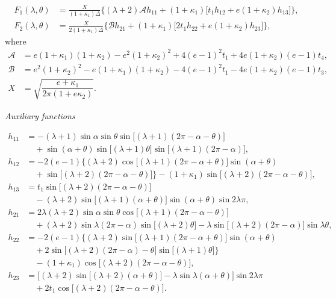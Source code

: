 \begin{align*}
F_1(\lambda,\theta)&=\frac{X}{(1+\kappa_1) \Delta}
\bigl\{(\lambda+2)\mathcal A h_{11}
+(1+\kappa_1)\bigl[t_1h_{12}+e(1+\kappa_2)h_{13}\bigr]\bigr\},
\\
F_2(\lambda,\theta)&=\frac{X}{2(1+\kappa_1)\Delta}
\bigl\{\mathcal B h_{21}
+(1+\kappa_1)\bigl[2t_1h_{22}+e(1+\kappa_2)h_{23}\bigr]\bigr\},
\end{align*}
where
\[
\begin{aligned}
	\mathcal A &= e(1+\kappa_1)(1+\kappa_2)
	-e^{2}(1+\kappa_2)^{2}
	+4(e-1)^{2}t_1
	+4e(1+\kappa_2)(e-1)t_4,\\
	\mathcal B &= e^{2}(1+\kappa_2)^{2}
	-e(1+\kappa_1)(1+\kappa_2)
	-4(e-1)^{2}t_1
	-4e(1+\kappa_2)(e-1)t_3,\\
	X &= \sqrt{\dfrac{e+\kappa_1}{2\pi(1+e\kappa_2)}}.
\end{aligned}
\]

\emph{Auxiliary functions}
 
\begin{equation*}
\begin{aligned}
	h_{11}&= -(\lambda+1)\sin\alpha\sin\theta
	\sin \bigl[(\lambda+1)(2\pi-\alpha-\theta)\bigr] 
	\\
	&\quad
	+\sin(\alpha+\theta)
	\sin \bigl[(\lambda+1)\theta\bigr]
	\sin \bigl[(\lambda+1)(2\pi-\alpha)\bigr],\\[4pt]
	h_{12}&=-2(e-1)\bigl\{(\lambda+2)
	\cos \bigl[(\lambda+1)(2\pi-\alpha+\theta)\bigr]\sin(\alpha+\theta)\\
	&\quad
	+\sin \bigl[(\lambda+2)(2\pi-\alpha-\theta)\bigr]\bigr\}
	-(1+\kappa_1)\sin \bigl[(\lambda+2)(2\pi-\alpha-\theta)\bigr],\\[4pt]
	h_{13}&= t_1\sin \bigl[(\lambda+2)(2\pi-\alpha-\theta)\bigr]\\
	&\quad
	-(\lambda+2)\sin \bigl[(\lambda+1)(\alpha+\theta)\bigr] 
	\sin(\alpha+\theta) \sin 2\lambda\pi,\\[4pt]
	h_{21}&= 2\lambda(\lambda+2)\sin\alpha\sin\theta
	\cos \bigl[(\lambda+1)(2\pi-\alpha-\theta)\bigr]\\
	&\quad
	+(\lambda+2)\sin\lambda(2\pi-\alpha)
	\sin \bigl[(\lambda+2)\theta\bigr]
	-\lambda\sin \bigl[(\lambda+2)(2\pi-\alpha)\bigr]\sin\lambda\theta,\\[4pt]
	h_{22}&=-2(e-1)\bigl\{
	(\lambda+2)\sin \bigl[(\lambda+1)(2\pi-\alpha+\theta)\bigr]\sin(\alpha+\theta)\\
	&\quad
	+2\sin\bigl[(\lambda+2)(2\pi-\alpha)-\theta\bigr]
	\sin \bigl[(\lambda+1)\theta\bigr]\bigr\} \\
	&\quad-(1+\kappa_1)\cos \bigl[(\lambda+2)(2\pi-\alpha-\theta)\bigr],\\[4pt]
	h_{23}&= \bigl[(\lambda+2)\sin \bigl[(\lambda+2)(\alpha+\theta)\bigr]
	-\lambda\sin\lambda(\alpha+\theta)\bigr]\sin 2\lambda\pi\\
	&\quad
	+2t_1\cos \bigl[(\lambda+2)(2\pi-\alpha-\theta)\bigr].
\end{aligned}
\end{equation*}

